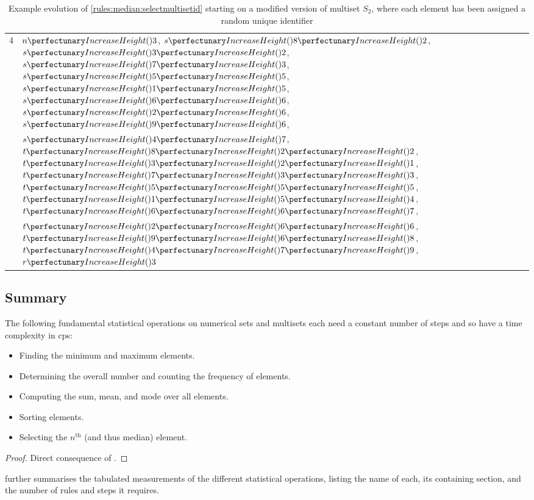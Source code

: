 \begin{table}[htbp]
\begin{tabular}{|r|l|}
    4 & \(\cpfunc{n}{3}\), \(\cpfuncn{s}{8}{2}\), \(\cpfuncn{s}{3}{2}\), \(\cpfuncn{s}{7}{3}\), \(\cpfuncn{s}{5}{5}\), \(\cpfuncn{s}{1}{5}\), \(\cpfuncn{s}{6}{6}\), \(\cpfuncn{s}{2}{6}\), \(\cpfuncn{s}{9}{6}\),\\& \(\cpfuncn{s}{4}{7}\), \(\cpfuncnn{t}{8}{2}{2}\), \(\cpfuncnn{t}{3}{2}{1}\), \(\cpfuncnn{t}{7}{3}{3}\), \(\cpfuncnn{t}{5}{5}{5}\), \(\cpfuncnn{t}{1}{5}{4}\), \(\cpfuncnn{t}{6}{6}{7}\),\\& \(\cpfuncnn{t}{2}{6}{6}\), \(\cpfuncnn{t}{9}{6}{8}\), \(\cpfuncnn{t}{4}{7}{9}\), \(\cpfunc{r}{3}\)\\ \hline
    
\end{tabular} 
\caption[Example evolution of \cref{rules:median:selectmultisetid}]{\label{tab:median:selectmultisetid}Example evolution of \cref{rules:median:selectmultisetid} starting on a modified version of multiset \(S_2\), where each element has been assigned a random unique identifier}
\end{table}

\subsection{Summary}

\begin{theorem}
The following fundamental statistical operations on numerical sets and multisets each need a constant number of steps and so have a time complexity  in \gls{cps}:
\begin{itemize}
    \item Finding the minimum and maximum elements.
    \item Determining the overall number and counting the frequency of elements.
    \item Computing the sum, mean, and mode over all elements.
    \item Sorting elements.
    \item Selecting the \(n^{\text{th}}\) (and thus median) element.
\end{itemize}
\end{theorem}

\begin{proof}
Direct consequence of .
\end{proof}

 further summarises the tabulated measurements of the different statistical operations, listing the name of each, its containing section, and the number of rules and steps it requires.


